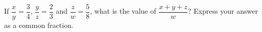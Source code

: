 If $\dfrac{x}{y}=\dfrac{3}{4}$, $\dfrac{y}{z}=\dfrac{2}{3}$ and $\dfrac{z}{w}=\dfrac{5}{8}$, what is the value of $\dfrac{x+y+z}{w}$? Express your answer as a common fraction.
